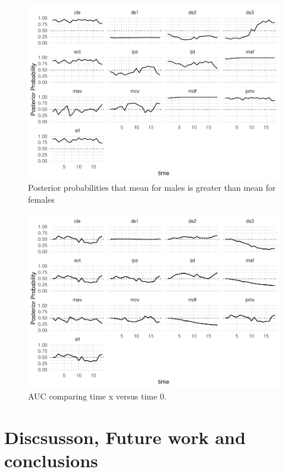 \documentclass[
  12pt,
]{article}
\begin{document}
\begin{figure}

{\centering \includegraphics{paper_files/figure-latex/prob0-plot-1} 

}

\caption{Posterior probabilities that mean for males is greater than mean for females}\label{fig:prob0-plot}
\end{figure}

\begin{figure}

{\centering \includegraphics{paper_files/figure-latex/AUC-plot-1} 

}

\caption{AUC comparing time x versus time 0.}\label{fig:AUC-plot}
\end{figure}

\hypertarget{sec:conclusions}{%
\section{Discsusson, Future work and
conclusions}\label{sec:conclusions}}
\end{document}
